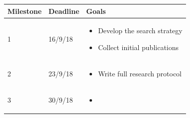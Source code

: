 \documentclass[]{book}
\providecommand{\tightlist}{%
  \setlength{\itemsep}{0pt}\setlength{\parskip}{0pt}}
\begin{document}
\begin{longtable}[]{@{}lll@{}}
\toprule
\begin{minipage}[b]{0.14\columnwidth}\raggedright\strut
Milestone\strut
\end{minipage} & \begin{minipage}[b]{0.13\columnwidth}\raggedright\strut
Deadline\strut
\end{minipage} & \begin{minipage}[b]{0.65\columnwidth}\raggedright\strut
Goals\strut
\end{minipage}\tabularnewline
\midrule
\endhead
\begin{minipage}[t]{0.32\columnwidth}\raggedright\strut
1\strut
\end{minipage} & \begin{minipage}[t]{0.32\columnwidth}\raggedright\strut
16/9/18\strut
\end{minipage} & \begin{minipage}[t]{0.32\columnwidth}\raggedright\strut
\begin{itemize}
\tightlist
\item
  Develop the search strategy
\item
  Collect initial publications
\end{itemize}\strut
\end{minipage}\tabularnewline
\begin{minipage}[t]{0.32\columnwidth}\raggedright\strut
2\strut
\end{minipage} & \begin{minipage}[t]{0.32\columnwidth}\raggedright\strut
23/9/18\strut
\end{minipage} & \begin{minipage}[t]{0.32\columnwidth}\raggedright\strut
\begin{itemize}
\tightlist
\item
  Write full research protocol
\end{itemize}\strut
\end{minipage}\tabularnewline
\begin{minipage}[t]{0.32\columnwidth}\raggedright\strut
3\strut
\end{minipage} & \begin{minipage}[t]{0.32\columnwidth}\raggedright\strut
30/9/18\strut
\end{minipage} & \begin{minipage}[t]{0.32\columnwidth}\raggedright\strut
\begin{itemize}
\tightlist
\item

\end{itemize}
\end{minipage}
\end{longtable}
\end{document}
